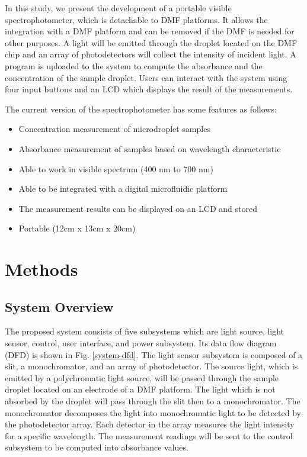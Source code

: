 \documentclass[conference]{IEEEtran}
\begin{document}
In this study, we present the development of a portable visible spectrophotometer, which is detachable to DMF platforms. It allows the integration with a DMF platform and can be removed if the DMF is needed for other purposes. A light will be emitted through the droplet located on the DMF chip and an array of photodetectors will collect the intensity of incident light. A program is uploaded to the system to compute the absorbance and the concentration of the sample droplet. Users can interact with the system using four input buttons and an LCD which displays the result of the measurements. 

The current version of the spectrophotometer has some features as follows:
\begin{itemize}
    \item Concentration measurement of microdroplet samples 
    \item Absorbance measurement of samples based on wavelength characteristic 
    \item Able to work in visible spectrum (400 nm to 700 nm) 
    \item Able to be integrated with a digital microfluidic platform 
    \item The measurement results can be displayed on an LCD and stored 
    \item Portable (12cm x 13cm x 20cm)
\end{itemize}

\section{Methods}
\subsection{System Overview}
The proposed system consists of five subsystems which are light source, light sensor, control, user interface, and power subsystem. Its data flow diagram (DFD) is shown in Fig. \ref{system-dfd}. The light sensor subsystem is composed of a slit, a monochromator, and an array of photodetector. The source light, which is emitted by a polychromatic light source, will be passed through the sample droplet located on an electrode of a DMF platform. The light which is not absorbed by the droplet will pass through the slit then to a monochromator. The monochromator decomposes the light into monochromatic light to be detected by the photodetector array. Each detector in the array measures the light intensity for a specific wavelength. The measurement readings will be sent to the control subsystem to be computed into absorbance values. 
\end{document}
